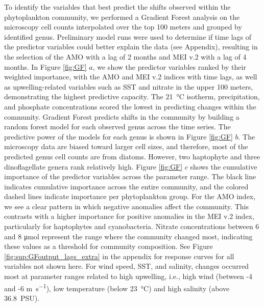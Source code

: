 \documentclass[draft]{agujournal2019}
\begin{document}
To identify the variables that best predict the shifts observed within the phytoplankton community, we performed a Gradient Forest analysis on the microscopy cell counts interpolated over the top 100 meters and grouped by identified genus. Preliminary model runs were used to determine if time lags of the predictor variables could better explain the data (see Appendix), resulting in the selection of the AMO with a lag of 2 months and MEI v.2 with a lag of 4 months. In Figure \ref{fig:GF} $a$, we show the predictor variables ranked by their weighted importance, with the AMO and MEI v.2 indices with time lags, as well as upwelling-related variables such as SST and nitrate in the upper 100 meters, demonstrating the highest predictive capacity. The \qty{21}{\celsius} isotherm, precipitation, and phosphate concentrations scored the lowest in predicting changes within the community. Gradient Forest predicts shifts in the community by building a random forest model for each observed genus across the time series. The predictive power of the models for each genus is shown in Figure \ref{fig:GF} $b$. The microscopy data are biased toward larger cell sizes, and therefore, most of the predicted genus cell counts are from diatoms. However, two haptophyte and three dinoflagellate genera rank relatively high.
Figure \ref{fig:GF} $c$ shows the cumulative importance of the predictor variables across the parameter range. The black line indicates cumulative importance across the entire community, and the colored dashed lines indicate importance per phytoplankton group. For the AMO index, we see a clear pattern in which negative anomalies affect the community. This contrasts with a higher importance for positive anomalies in the MEI v.2 index, particularly for haptophytes and cyanobacteria. Nitrate concentrations between 6 and 8 \unit{\micro \mole} represent the range where the community changed most, indicating these values as a threshold for community composition. See Figure \ref{fig:sup:GFoutput_lags_extra} in the appendix for response curves for all variables not shown here. For wind speed, SST, and salinity, changes occurred most at parameter ranges related to high upwelling, i.e., high wind (between -4 and -6 \unit{m.s^{-1}}), low temperature (below \qty{23}{\celsius}) and high salinity (above \qty{36.8}{PSU}). 
\end{document}
